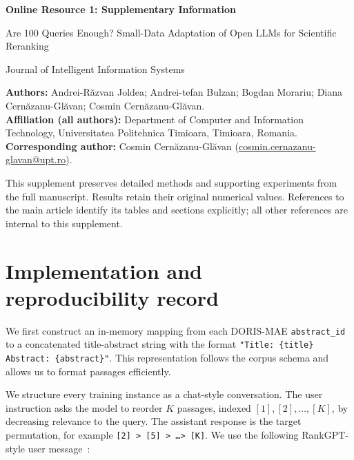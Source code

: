 \documentclass[pdflatex,sn-basic,Numbered]{sn-jnl}%
\theoremstyle{thmstyleone}%
\theoremstyle{thmstyletwo}%
\theoremstyle{thmstylethree}%
\begin{document}
\begin{center}
{\Large\bfseries Online Resource 1: Supplementary Information\par}
\medskip
{\large Are 100 Queries Enough? Small-Data Adaptation of Open LLMs for Scientific Reranking\par}
\medskip
Journal of Intelligent Information Systems
\end{center}
\noindent\textbf{Authors:} Andrei-R\u{a}zvan Joldea; Andrei-tefan Bulzan; Bogdan Morariu;
Diana Cern\u{a}zanu-Gl\u{a}van; Cosmin Cern\u{a}zanu-Gl\u{a}van.\\
\textbf{Affiliation (all authors):} Department of Computer and Information Technology,
Universitatea Politehnica Timioara, Timioara, Romania.\\
\textbf{Corresponding author:} Cosmin Cern\u{a}zanu-Gl\u{a}van (\href{mailto:cosmin.cernazanu-glavan@upt.ro}{cosmin.cernazanu-glavan@upt.ro}).

This supplement preserves detailed methods and supporting experiments from the full manuscript. Results retain their original numerical values. References to the main article identify its tables and sections explicitly; all other references are internal to this supplement.

\FloatBarrier
\section{Implementation and reproducibility record}
\label{supp:implementation}

We first construct an in-memory mapping from each DORIS-MAE
\texttt{abstract\_id} to a concatenated title-abstract string with the format
\texttt{"Title: \{title\} Abstract: \{abstract\}"}. This representation follows the
corpus schema and allows us to format passages efficiently.

We structure every training instance as a chat-style conversation. The user
instruction asks the model to reorder $K$ passages, indexed $[1], [2], \dots, [K]$,
by decreasing relevance to the query. The assistant response is the target
permutation, for example \texttt{[2] > [5] > \dots > [K]}. We use the following
RankGPT-style user message~\cite{Sun}:
\end{document}
